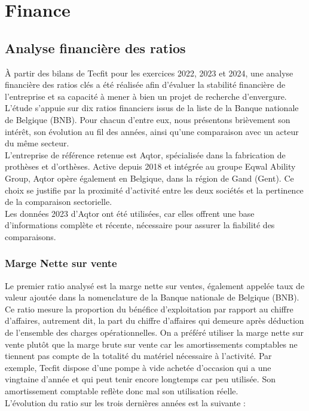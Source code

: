 \chapter{Finance}
\section{Analyse financière des ratios}
À partir des bilans de Tecfit pour les exercices 2022, 2023 et 2024, une analyse financière des ratios clés a été réalisée afin d’évaluer la stabilité financière de l’entreprise et sa capacité à mener à bien un projet de recherche d’envergure.\\
L’étude s’appuie sur dix ratios financiers issus de la liste de la Banque nationale de Belgique (BNB). Pour chacun d’entre eux, nous présentons brièvement son intérêt, son évolution au fil des années, ainsi qu’une comparaison avec un acteur du même secteur.\\
L’entreprise de référence retenue est Aqtor, spécialisée dans la fabrication de prothèses et d’orthèses. Active depuis 2018 et intégrée au groupe Eqwal Ability Group, Aqtor opère également en Belgique, dans la région de Gand (Gent). Ce choix se justifie par la proximité d’activité entre les deux sociétés et la pertinence de la comparaison sectorielle.\\
Les données 2023 d’Aqtor ont été utilisées, car elles offrent une base d’informations complète et récente, nécessaire pour assurer la fiabilité des comparaisons.

\subsection{Marge Nette sur vente}
Le premier ratio analysé est la marge nette sur ventes, également appelée taux de valeur ajoutée dans la nomenclature de la Banque nationale de Belgique (BNB). Ce ratio mesure la proportion du bénéfice d’exploitation par rapport au chiffre d’affaires, autrement dit, la part du chiffre d’affaires qui demeure après déduction de l’ensemble des charges opérationnelles. On a préféré utiliser la marge nette sur vente plutôt que la marge brute sur vente car les amortissements comptables ne tiennent pas compte de la totalité du matériel nécessaire à l’activité. Par exemple, Tecfit dispose d’une pompe à vide achetée d’occasion qui a une vingtaine d’année et qui peut tenir encore longtemps car peu utilisée. Son amortissement comptable reflète donc mal son utilisation réelle.\\
L’évolution du ratio sur les trois dernières années est la suivante :

